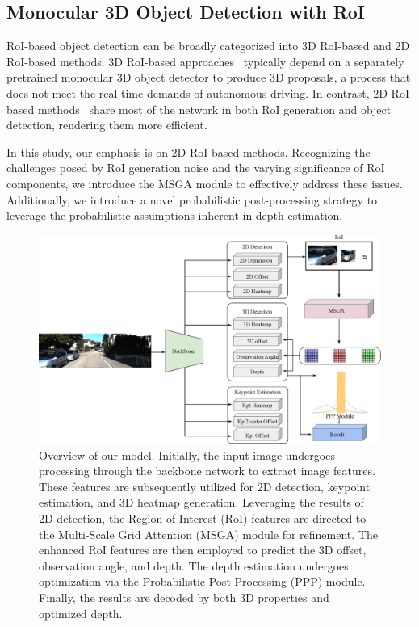 \documentclass[journal]{IEEEtran}
\begin{document}
	\subsection{Monocular 3D Object Detection with RoI}
	
	RoI-based object detection can be broadly categorized into 3D RoI-based and 2D RoI-based methods. 3D RoI-based approaches~\cite{neurocs, monoxiver} typically depend on a separately pretrained monocular 3D object detector to produce 3D proposals, a process that does not meet the real-time demands of autonomous driving. In contrast, 2D RoI-based methods~\cite{roi10d, didm3d, gupnet, gupnet++} share most of the network in both RoI generation and object detection, rendering them more efficient.
	
	In this study, our emphasis is on 2D RoI-based methods. Recognizing the challenges posed by RoI generation noise and the varying significance of RoI components, we introduce the MSGA module to effectively address these issues. Additionally, we introduce a novel probabilistic post-processing strategy to leverage the probabilistic assumptions inherent in depth estimation.
	\begin{figure}[!t]
		\centering
		\includegraphics[width=1.0\linewidth]{overview.eps}
		\caption{Overview of our model. Initially, the input image undergoes processing through the backbone network to extract image features. These features are subsequently utilized for 2D detection, keypoint estimation, and 3D heatmap generation. Leveraging the results of 2D detection, the Region of Interest (RoI) features are directed to the Multi-Scale Grid Attention (MSGA) module for refinement. The enhanced RoI features are then employed to predict the 3D offset, observation angle, and depth. The depth estimation undergoes optimization via the Probabilistic Post-Processing (PPP) module. Finally, the results are decoded by both 3D properties and optimized depth.}
		\label{fig:overview}
	\end{figure}
	
\end{document}
